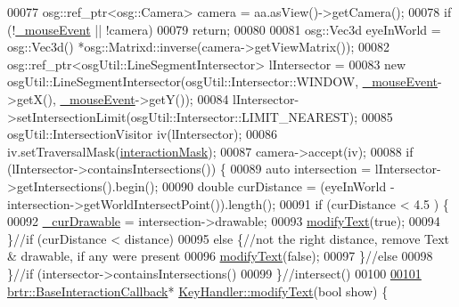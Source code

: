\begin{DoxyCode}
00077         osg::ref\_ptr<osg::Camera> camera = aa.asView()->getCamera();
00078         \textcolor{keywordflow}{if} (!\hyperlink{classbrtr_1_1_key_handler_a1b2404dcd19426a93d4474cd45da84e8}{\_mouseEvent} || !camera)
00079             \textcolor{keywordflow}{return};
00080 
00081         osg::Vec3d eyeInWorld = osg::Vec3d() *osg::Matrixd::inverse(camera->getViewMatrix());
00082         osg::ref\_ptr<osgUtil::LineSegmentIntersector> lIntersector =
00083             \textcolor{keyword}{new} osgUtil::LineSegmentIntersector(osgUtil::Intersector::WINDOW, 
      \hyperlink{classbrtr_1_1_key_handler_a1b2404dcd19426a93d4474cd45da84e8}{\_mouseEvent}->getX(), \hyperlink{classbrtr_1_1_key_handler_a1b2404dcd19426a93d4474cd45da84e8}{\_mouseEvent}->getY());
00084         lIntersector->setIntersectionLimit(osgUtil::Intersector::LIMIT\_NEAREST);
00085         osgUtil::IntersectionVisitor iv(lIntersector);
00086         iv.setTraversalMask(\hyperlink{namespacebrtr_a2060f4d70c0e3bc7e2e35f82e279a40d}{interactionMask});
00087         camera->accept(iv);
00088         \textcolor{keywordflow}{if} (lIntersector->containsIntersections()) \{
00089             \textcolor{keyword}{auto} intersection = lIntersector->getIntersections().begin();           
00090             \textcolor{keywordtype}{double} curDistance = (eyeInWorld - intersection->getWorldIntersectPoint()).length();
00091             \textcolor{keywordflow}{if} (curDistance < 4.5 ) \{
00092                 \hyperlink{classbrtr_1_1_key_handler_a4b0e380186a8172af6cf7c10dcff675a}{\_curDrawable} = intersection->drawable;
00093                 \hyperlink{classbrtr_1_1_key_handler_a1925fa114839192716167477714abfdc}{modifyText}(\textcolor{keyword}{true});
00094             \}\textcolor{comment}{//if (curDistance < distance)}
00095             \textcolor{keywordflow}{else} \{\textcolor{comment}{//not the right distance, remove Text & drawable, if any were present}
00096                 \hyperlink{classbrtr_1_1_key_handler_a1925fa114839192716167477714abfdc}{modifyText}(\textcolor{keyword}{false});
00097             \}\textcolor{comment}{//else}
00098         \}\textcolor{comment}{//if (intersector->containsIntersections()}
00099     \}\textcolor{comment}{//intersect()}
00100 
\hypertarget{_key_handler_8cpp_source_l00101}{}\hyperlink{classbrtr_1_1_key_handler_a1925fa114839192716167477714abfdc}{00101}     \hyperlink{classbrtr_1_1_base_interaction_callback}{brtr::BaseInteractionCallback}* 
      \hyperlink{classbrtr_1_1_key_handler_a1925fa114839192716167477714abfdc}{KeyHandler::modifyText}(\textcolor{keywordtype}{bool} show) \{

\end{DoxyCode}
